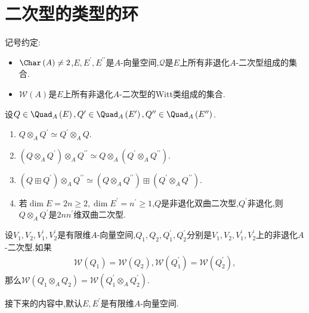 \section{二次型的类型的环}

记号约定:
\begin{itemize}
	\item $\Char\left(A\right)\neq 2$,$E,E^{\prime},E^{\prime\prime}$是$A$-向量空间,$\mathcal{Q}$是$E$上所有非退化$A$-二次型组成的集合.
	\item $\mathcal{W}\left(A\right)$是$E$上所有非退化$A$-二次型的Witt类组成的集合.
\end{itemize}

\begin{proposition}{}{}
	设$Q\in\Quad_{A}\left(E\right),Q^{\prime}\in\Quad_{A}\left(E^{\prime}\right),Q^{\prime\prime}\in\Quad_{A}\left(E^{\prime\prime}\right)$.
	\begin{enumerate}
		\item $Q\otimes_{A}Q^{\prime}\simeq Q^{\prime}\otimes_{A}Q$.
		\item $\left(Q\otimes_{A}Q^{\prime}\right)\otimes_{A}Q^{\prime\prime}\simeq Q\otimes_{A}\left(Q^{\prime}\otimes_{A}Q^{\prime\prime}\right)$.
		\item $\left(Q\boxplus Q^{\prime}\right)\otimes_{A}Q^{\prime\prime}\simeq\left(Q\otimes_{A}Q^{\prime\prime}\right)\boxplus\left(Q^{\prime}\otimes_{A}Q^{\prime\prime}\right)$.
		\item 若$\dim E=2n\geq 2,\dim E^{\prime}=n^{\prime}\geq 1$,$Q$是非退化双曲二次型,$Q^{\prime}$非退化,则$Q\otimes_{A}Q^{\prime}$是$2nn^{\prime}$维双曲二次型.
	\end{enumerate}
\end{proposition}

\begin{proposition}{}{}
	设$V_{1},V_{2},V_{1}^{\prime},V_{2}^{\prime}$是有限维$A$-向量空间,$Q_{1},Q_{2},Q_{1}^{\prime},Q_{2}^{\prime}$分别是$V_{1},V_{2},V_{1}^{\prime},V_{2}^{\prime}$上的非退化$A$-二次型.如果
	\begin{align*}
		\mathcal{W}\left(Q_{1}\right)=\mathcal{W}\left(Q_{2}\right),\mathcal{W}\left(Q_{1}^{\prime}\right)=\mathcal{W}\left(Q_{2}^{\prime}\right),
	\end{align*}
	那么$\mathcal{W}\left(Q_{1}\otimes_{A}Q_{2}\right)=\mathcal{W}\left(Q_{1}^{\prime}\otimes_{A}Q_{2}^{\prime}\right)$.
\end{proposition}

接下来的内容中,默认$E,E^{\prime}$是有限维$A$-向量空间.

